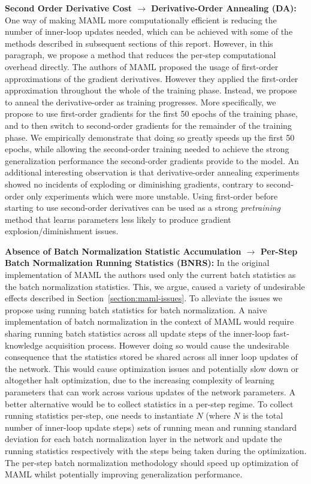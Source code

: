 \documentclass{article} \usepackage[dvipsnames]{xcolor}
\begin{document}
\textbf{Second Order Derivative Cost $\rightarrow$ Derivative-Order Annealing (DA):} One way of making MAML more computationally efficient is reducing the number of inner-loop updates needed, which can be achieved with some of the methods described in subsequent sections of this report. However, in this paragraph, we propose a method that reduces the per-step computational overhead directly. The authors of MAML proposed the usage of first-order approximations of the gradient derivatives. However they applied the first-order approximation throughout the whole of the training phase. Instead, we propose to anneal the derivative-order as training progresses. More specifically, we propose to use first-order gradients for the first 50 epochs of the training phase, and to then switch to second-order gradients for the remainder of the training phase. We empirically demonstrate that doing so greatly speeds up the first 50 epochs, while allowing the second-order training needed to achieve the strong generalization performance the second-order gradients provide to the model. An additional interesting observation is that derivative-order annealing experiments showed no incidents of exploding or diminishing gradients, contrary to second-order only experiments which were more unstable. Using first-order before starting to use second-order derivatives can be used as a strong \emph{pretraining} method that learns parameters less likely to produce gradient explosion/diminishment issues.

\textbf{Absence of Batch Normalization Statistic Accumulation $\rightarrow$ Per-Step Batch Normalization Running Statistics (BNRS):} In the original implementation of MAML \cite{finn2017model} the authors used only the current batch statistics as the batch normalization statistics. This, we argue, caused a variety of undesirable effects described in Section~\ref{section:maml-issues}. To alleviate the issues we propose using running batch statistics for batch normalization. A naive implementation of batch normalization in the context of MAML would require sharing running batch statistics across all update steps of the inner-loop fast-knowledge acquisition process. However doing so would cause the undesirable consequence that the statistics stored be shared across all inner loop updates of the network. This would cause optimization issues and potentially slow down or altogether halt optimization, due to the increasing complexity of learning parameters that can work across various updates of the network parameters. A better alternative would be to collect statistics in a per-step regime. To collect running statistics per-step, one needs to instantiate $N$ (where $N$ is the total number of inner-loop update steps) sets of running mean and running standard deviation for each batch normalization layer in the network and update the running statistics respectively with the steps being taken during the optimization. The per-step batch normalization methodology should speed up optimization of MAML whilst potentially improving generalization performance.
\end{document}
